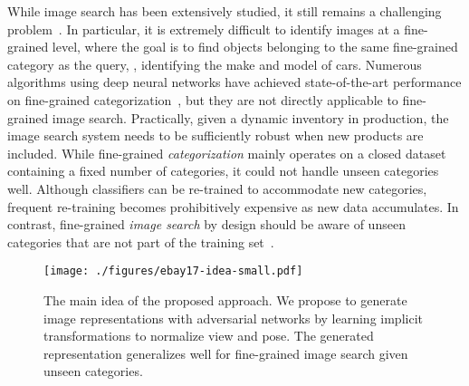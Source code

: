 \documentclass[runningheads]{llncs}
\begin{document}
While image search has been extensively studied, it still remains a challenging problem~\cite{DBLP:conf/iccv/SivicZ03,DBLP:conf/mm/WanWHWZZL14,DBLP:conf/kdd/JingLKZXDT15,DBLP:conf/kdd/YangKBSWKP17}. In particular, it is extremely difficult to identify images at a fine-grained level, where the goal is to find objects belonging to the same fine-grained category as the query, \eg, identifying the make and model of cars. 
Numerous algorithms using deep neural networks have achieved state-of-the-art performance on fine-grained categorization~\cite{DBLP:conf/cvpr/DengK013,DBLP:conf/icpr/KrauseGDLF14,DBLP:conf/cvpr/KrauseJYL15,DBLP:conf/cvpr/QianJZL15,DBLP:conf/cvpr/XieYWL15,lin2015bilinear,DBLP:conf/cvpr/CuiZLB16,zhou2016fine,cui2017kernel}, but they are not directly applicable to fine-grained image search. 
Practically, given a dynamic inventory in production, the image search system needs to be sufficiently robust when new products are included.
While fine-grained \emph{categorization} mainly operates on a closed dataset containing a fixed number of categories, it could not handle unseen categories well.
Although classifiers can be re-trained to accommodate new categories, frequent re-training becomes prohibitively expensive as new data accumulates.
In contrast, fine-grained \emph{image search} by design should be aware of unseen categories that are not part of the training set~\cite{DBLP:journals/corr/YaoZZLT17a}. 

\setlength{\textfloatsep}{12pt}\begin{figure}[t]
\begin{center}
\texttt{[image: ./figures/ebay17-idea-small.pdf]}
\end{center} 
\vspace{-3mm}
\caption{The main idea of the proposed approach. 
We propose to generate image representations with adversarial networks by learning implicit transformations to normalize view and pose. The generated representation generalizes well for fine-grained image search given unseen categories.}
\label{fig:idea}
\end{figure}
\end{document}
